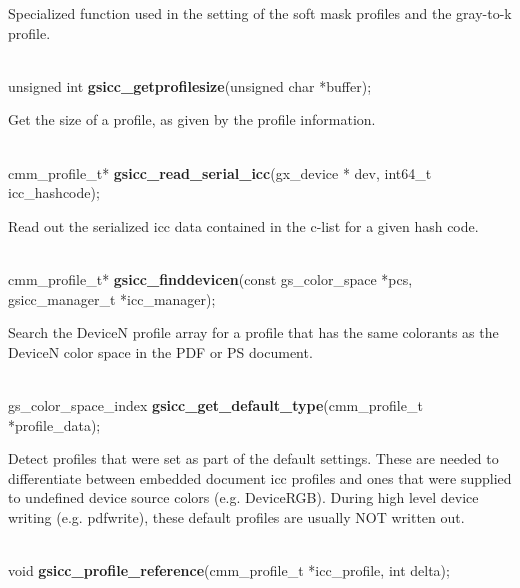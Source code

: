 \documentclass[12pt,notitlepage]{article}
\begin{document}
\begin{minipage}[h]{6.0in}
Specialized function used in the setting of the soft mask profiles and the gray-to-k profile.
\end{minipage}\\

\noindent unsigned int {\bf gsicc\_getprofilesize}(unsigned char *buffer);\\

\begin{minipage}[h]{6.0in}
Get the size of a profile, as given by the profile information.
\end{minipage}\\

\noindent cmm\_profile\_t* {\bf gsicc\_read\_serial\_icc}(gx\_device * dev, int64\_t icc\_hashcode);\\

\begin{minipage}[h]{6.0in}
Read out the serialized icc data contained in the c-list for a given hash code.
\end{minipage}\\

\noindent cmm\_profile\_t* {\bf gsicc\_finddevicen}(const gs\_color\_space *pcs, gsicc\_manager\_t *icc\_manager);\\

\begin{minipage}[h]{6.0in}
Search the DeviceN profile array for a profile that has the same colorants as the DeviceN color space in the PDF or PS document.
\end{minipage}\\

\noindent gs\_color\_space\_index {\bf gsicc\_get\_default\_type}(cmm\_profile\_t *profile\_data);\\

\begin{minipage}[h]{6.0in}
Detect profiles that were set as part of the default settings.  These are needed to differentiate between embedded document icc profiles and ones that were supplied to undefined device source colors (e.g. DeviceRGB).  During high level device writing (e.g. pdfwrite), these default profiles are usually NOT written out.
\end{minipage}\\


\noindent void {\bf gsicc\_profile\_reference}(cmm\_profile\_t *icc\_profile, int delta);\\
\end{document}
